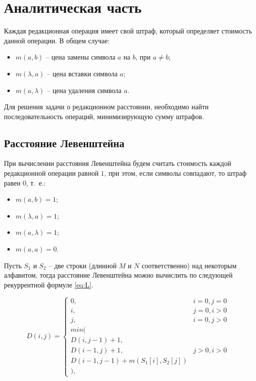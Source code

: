 \chapter{Аналитическая часть}

Каждая редакционная операция имеет свой штраф, который определяет стоимость данной операции. В общем случае:
\begin{itemize}
	\item $ m(a, b) $ -- цена замены символа $ a $ на $ b $, при $ a \ne b $;
	\item $ m(\lambda, a) $ -- цена вставки символа $ a $;
	\item $ m(a, \lambda) $ -- цена удаления символа $ a $.
\end{itemize}

Для решения задачи о редакционном расстоянии, необходимо найти последовательность операций, минимизирующую сумму штрафов. 

\section{Расстояние Левенштейна}

При вычислении расстояния Левенштейна будем считать стоимость каждой редакционной операции равной $ 1 $, при этом, если символы совпадают, то штраф равен $0$, т.~е.:
\begin{itemize}
	\item $ m(a, b) = 1 $;
	\item $ m(\lambda, a) = 1 $;
	\item $ m(a, \lambda) = 1 $;
	\item $ m(a, a) = 0 $.
\end{itemize}

Пусть $S_1$ и $S_2$ -- две строки (длинной $M$ и $N$ соответственно) над некоторым алфавитом, тогда расстояние Левенштейна можно вычислить по следующей рекуррентной формуле \eqref{eq:L}.

\begin{equation}
	\label{eq:L}
	D(i,j) = \left\{ \begin{array}{ll}
		0, & \textrm{$i = 0, j = 0$}\\
		i, & \textrm{$j = 0, i > 0$}\\
		j, & \textrm{$i = 0, j > 0$}\\
		min(\\
		D(i,j-1)+1,\\
		D(i-1, j) +1, &\textrm{$j>0, i>0$}\\
		D(i-1, j-1) + m(S_{1}[i], S_{2}[j])\\
		),
	\end{array} \right.
\end{equation}

